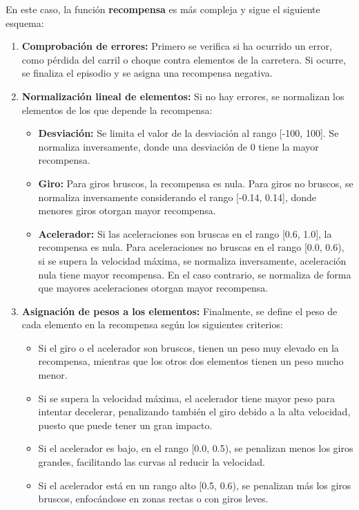 En este caso, la función \textbf{recompensa} es más compleja y sigue el siguiente esquema:
\begin{enumerate}
    \item \textbf{Comprobación de errores:} Primero se verifica si ha ocurrido un error, como pérdida del carril o choque contra elementos de la carretera. Si ocurre, se finaliza el episodio y se asigna una recompensa negativa.

    \item \textbf{Normalización lineal de elementos:} Si no hay errores, se normalizan los elementos de los que depende la recompensa:
    \begin{itemize}
        \item \textbf{Desviación:} Se limita el valor de la desviación al rango [-100, 100]. Se normaliza inversamente, donde una desviación de 0 tiene la mayor recompensa.
        \item \textbf{Giro:} Para giros bruscos, la recompensa es nula. Para giros no bruscos, se normaliza inversamente considerando el rango [-0.14, 0.14], donde menores giros otorgan mayor recompensa.
        \item \textbf{Acelerador:} Si las aceleraciones son bruscas en el rango [0.6, 1.0], la recompensa es nula. Para aceleraciones no bruscas en el rango [0.0, 0.6), si se supera la velocidad máxima, se normaliza inversamente, aceleración nula tiene mayor recompensa. En el caso contrario, se normaliza de forma que mayores aceleraciones otorgan mayor recompensa.
    \end{itemize}

    \item \textbf{Asignación de pesos a los elementos:} Finalmente, se define el peso de cada elemento en la recompensa según los siguientes criterios:
    \begin{itemize}
        \item Si el giro o el acelerador son bruscos, tienen un peso muy elevado en la recompensa, mientras que los otros dos elementos tienen un peso mucho menor.
        \item Si se supera la velocidad máxima, el acelerador tiene mayor peso para intentar decelerar, penalizando también el giro debido a la alta velocidad, puesto que puede tener un gran impacto.
        \item Si el acelerador es bajo, en el rango [0.0, 0.5), se penalizan menos los giros grandes, facilitando las curvas al reducir la velocidad.
        \item Si el acelerador está en un rango alto [0.5, 0.6), se penalizan más los giros bruscos, enfocándose en zonas rectas o con giros leves.
    \end{itemize}
\end{enumerate}

